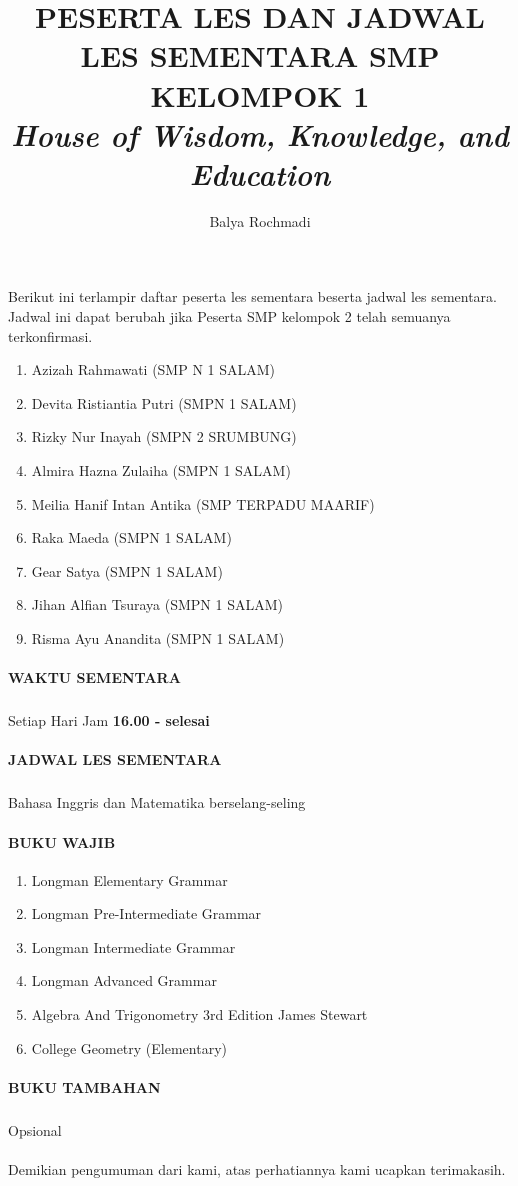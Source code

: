 \documentclass[12pt,a4paper]{article}
\author{Balya Rochmadi}
\title{PESERTA LES DAN JADWAL LES SEMENTARA SMP KELOMPOK 1 \\  \textit{House of Wisdom, Knowledge, and Education}}
\begin{document}
	\maketitle
	\paragraph*{}
	Berikut ini terlampir daftar peserta les sementara beserta jadwal les sementara. Jadwal ini dapat berubah jika Peserta SMP kelompok 2 telah semuanya terkonfirmasi.
	\begin{enumerate}
		\item Azizah Rahmawati (SMP N 1 SALAM)
		\item Devita Ristiantia Putri (SMPN 1 SALAM)
		\item Rizky Nur Inayah (SMPN 2 SRUMBUNG)
		\item Almira Hazna Zulaiha (SMPN 1 SALAM)
		\item Meilia Hanif Intan Antika (SMP TERPADU MAARIF)
		\item Raka Maeda (SMPN 1 SALAM)
		\item Gear Satya (SMPN 1 SALAM)
		\item Jihan Alfian Tsuraya (SMPN 1 SALAM)
		\item Risma Ayu Anandita (SMPN 1 SALAM)
	\end{enumerate}
	\paragraph{WAKTU SEMENTARA}
		\subparagraph*{} 
		Setiap Hari Jam \textbf{16.00 - selesai}
	\paragraph{JADWAL LES SEMENTARA}
		\subparagraph*{}
		Bahasa Inggris dan Matematika berselang-seling 
	\paragraph{BUKU WAJIB}
		\begin{enumerate}
			\item Longman Elementary Grammar
			\item Longman Pre-Intermediate Grammar
			\item Longman Intermediate Grammar
			\item Longman Advanced Grammar
			\item Algebra And Trigonometry 3rd Edition James Stewart 
			\item College Geometry (Elementary)
		\end{enumerate}
	\paragraph{BUKU TAMBAHAN}
		\subparagraph*{}
			Opsional
	\paragraph*{}
			Demikian pengumuman dari kami, atas perhatiannya kami ucapkan terimakasih.		
\end{document}
